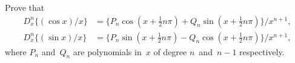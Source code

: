 Prove that
\begin{align*}
D_{x}^{n} \{(\cos x)/x\}
  &= \{P_{n} \cos(x + \tfrac{1}{2}n\pi)
     + Q_{n} \sin(x + \tfrac{1}{2}n\pi)\}/x^{n+1},\\
D_{x}^{n} \{(\sin x)/x\}
  &= \{P_{n} \sin(x + \tfrac{1}{2}n\pi)
     - Q_{n} \cos(x + \tfrac{1}{2}n\pi)\}/x^{n+1},
\end{align*}
where $P_{n}$ and~$Q_{n}$ are polynomials in~$x$ of degree $n$~and~$n-1$ respectively.

